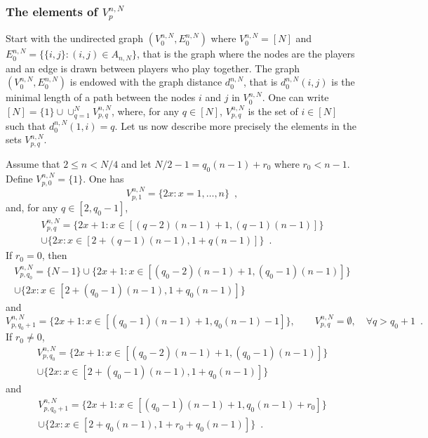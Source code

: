 \subsubsection{The elements of $V_p^{n,N}$}
Start with the undirected graph $(V^{n,N}_0,E^{n,N}_0)$ where $V^{n,N}_0=[N]$ and $E^{n,N}_0=\{\{i,j\} : (i,j)\in A_{n,N}\}$, that is the graph where the nodes are the players and an edge is drawn between players who play together. The graph $(V^{n,N}_0,E^{n,N}_0)$ is endowed with the graph distance $d^{n,N}_0$, that is $d^{n,N}_0(i,j)$ is the minimal length of a path between the nodes $i$ and $j$ in $V^{n,N}_0$. One can write $[N]=\{1\}\cup\cup_{q=1}^{N}V^{n,N}_{p,q}$, where, for any $q\in[N]$, $V^{n,N}_{p,q}$ is the set of $i\in[N]$ such that $d^{n,N}_0(1,i)=q$. Let us now describe more precisely the elements in the sets $V_{p,q}^{n,N}$. 
\begin{lemma}\label{lem:ElementsAtDistanceq} Assume that $2\le n<N/4$ and let $N/2-1= q_0(n-1)+r_0$ where $r_0<n-1$. Define $V_{p,0}^{n,N}=\{1\}$. One has
\begin{equation}\label{def:V1}
V_{p,1}^{n,N}=\{2x : x=1,\ldots,n\}\enspace, 
\end{equation}
and, for any $q\in[2,q_0-1]$, 
\begin{multline}\label{def:Vq}
V_{p,q}^{n,N}=\{2x+1 : x\in[(q-2)(n-1)+1,(q-1)(n-1)]\}\\
\cup\{2x : x\in[2+(q-1)(n-1),1+q(n-1)]\}\enspace.
\end{multline}
If $r_0=0$, then
\begin{multline}\label{def:Vq0}
V_{p,q_0}^{n,N}=\{N-1\}\cup\{2x+1 : x\in[(q_0-2)(n-1)+1,(q_0-1)(n-1)]\}\\
\cup\{2x : x\in[2+(q_0-1)(n-1),1+q_0(n-1)]\}
\end{multline}
and
\begin{equation}\label{def:Vq01}
V_{p,q_0+1}^{n,N}=\{2x+1 : x\in[(q_0-1)(n-1)+1,q_0(n-1)-1]\},\qquad V_{p,q}^{n,N}=\emptyset,\quad\forall q>q_0+1\enspace.
\end{equation}
If $r_0\ne 0$, 
\begin{multline}\label{def:Vq0'}
V_{p,q_0}^{n,N}=\{2x+1 : x\in[(q_0-2)(n-1)+1,(q_0-1)(n-1)]\}\\
\cup\{2x : x\in[2+(q_0-1)(n-1),1+q_0(n-1)]\}
\end{multline}
and
\begin{multline}\label{def:Vq01'}
V_{p,q_0+1}^{n,N}=\{2x+1 : x\in[(q_0-1)(n-1)+1,q_0(n-1)+r_0]\}\\
\cup\{2x : x\in[2+q_0(n-1),1+r_0+q_0(n-1)]\}\enspace.
\end{multline}
\end{lemma}
